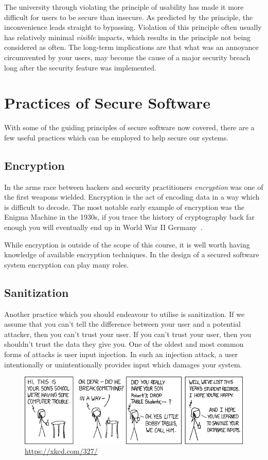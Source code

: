 The university through violating the principle of usability has made it more difficult for users to be secure than insecure.
As predicted by the principle, the inconvenience leads straight to bypassing.
Violation of this principle often usually has relatively minimal \emph{visible} impacts,
which results in the principle not being considered as often.
The long-term implications are that what was an annoyance circumvented by your users,
may become the cause of a major security breach long after the security feature was implemented.


\section{Practices of Secure Software}
With some of the guiding principles of secure software now covered,
there are a few useful practices which can be employed to help secure our systems.

\subsection{Encryption}
In the arms race between hackers and security practitioners \textsl{encryption} was one of the first weapons wielded.
Encryption is the act of encoding data in a way which is difficult to decode.
The most notable early example of encryption was the Enigma Machine in the 1930s,
if you trace the history of cryptography back far enough you will eventually end up in World War II Germany~\cite{web-application-security}.

While encryption is outside of the scope of this course,
it is well worth having knowledge of available encryption techniques.
In the design of a secured software system encryption can play many roles.

\subsection{Sanitization}
Another practice which you should endeavour to utilise is sanitization.
If we assume that you can't tell the difference between your user and a potential attacker,
then you can't trust your user.
If you can't trust your user, then you shouldn't trust the data they give you.
One of the oldest and most common forms of attacks is user input injection.
In such an injection attack, a user intentionally or unintentionally provides input which damages your system.

\begin{figure}[ht]
\begin{center}
\includegraphics[width=\textwidth]{bobbytables.png}
\end{center}
\caption{\url{https://xkcd.com/327/}}
\end{figure}

